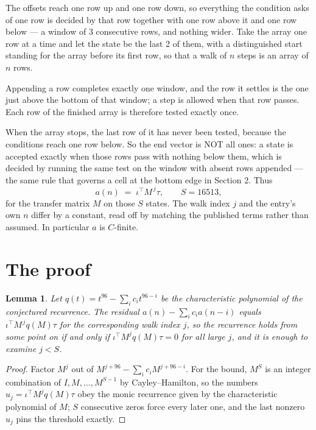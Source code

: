 \documentclass[11pt,a4paper]{article}
\theoremstyle{plain}
\newtheorem{lemma}[theorem]{Lemma}
\theoremstyle{definition}
\begin{document}
The offsets reach one row up and one row down, so everything the condition asks of one row is
decided by that row together with one row above it and one row below --- a window of
$3$ consecutive rows, and nothing wider. Take the array one row at a time and
let the state be the last 2 of them, with a distinguished start standing for the array before its
first row, so that a walk of $n$ steps is an array of $n$ rows.

Appending a row completes exactly one window, and the row it settles is the one just above the bottom of that window; a step is
allowed when that row passes. Each row of the finished array is therefore tested exactly once.

When the array stops, the last row of it has never been tested, because the
conditions reach one row below. So the end vector is NOT all ones: a state is accepted exactly when
those rows pass with nothing below them, which is decided by running the same test on the window
with absent rows appended --- the same rule that governs a cell at the bottom edge in
Section 2.
Thus
\[
a(n)\;=\;\iota^{\!\top}M^{\,j}\tau ,\qquad S=16513,
\]
for the transfer matrix $M$ on those $S$ states. The walk index $j$ and the entry's own $n$
differ by a constant, read off by matching the published terms rather than assumed. In
particular $a$ is $C$-finite.

\section{The proof}

\begin{lemma}\label{lem:crit}
Let $q(t)=t^{96}-\sum_i c_it^{96-i}$ be the characteristic polynomial of the
conjectured recurrence. The residual $a(n)-\sum_ic_ia(n-i)$ equals
$\iota^{\!\top}M^{\,j}q(M)\tau$ for the corresponding walk index $j$, so the recurrence
holds from some point on if and only if $\iota^{\!\top}M^{j}q(M)\tau=0$ for all large $j$,
and it is enough to examine $j<S$.
\end{lemma}

\begin{proof}
Factor $M^{j}$ out of $M^{j+96}-\sum_ic_iM^{j+96-i}$. For the bound, $M^{S}$
is an integer combination of $I,M,\dots,M^{S-1}$ by Cayley--Hamilton, so the numbers
$u_j=\iota^{\!\top}M^{j}q(M)\tau$ obey the monic recurrence given by the characteristic
polynomial of $M$; $S$ consecutive zeros force every later one, and the last nonzero $u_j$
pins the threshold exactly.
\end{proof}
\end{document}
